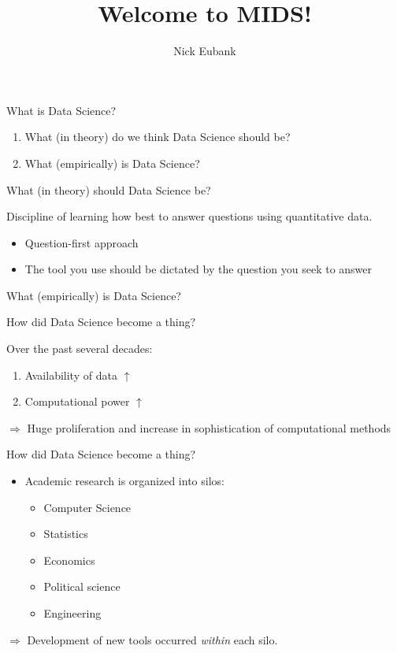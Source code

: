 \documentclass[11pt]{beamer}
\title{Welcome to MIDS!}
\author{\small Nick Eubank}
\date{\vspace*{.3in} \date}
\begin{document}
\begin{frame}
\maketitle
\end{frame}


\begin{frame}[c]{What is Data Science?}
\begin{enumerate}
	\pause \item What (\alert{in theory}) do we think Data Science should be?
	\pause \item What (\alert{empirically}) is Data Science?
\end{enumerate}
\end{frame}


\begin{frame}[c]{What (in theory) should Data Science be?}

\pause Discipline of learning how best to \alert{answer questions} using \alert{quantitative data.}

\pause
\begin{itemize}
	\item Question-first approach \\
	\pause \item The tool you use should be dictated by the question you seek to answer
\end{itemize}

\end{frame}

\begin{frame}[c]{What (empirically) is Data Science?}

\end{frame}

\begin{frame}[c]{How did Data Science become a thing?}

Over the past several decades:
\begin{enumerate}
	\item Availability of data $\uparrow$
	\item Computational power $\uparrow$
\end{enumerate}
\pause
$\Rightarrow$ Huge proliferation and increase in sophistication of computational methods
\end{frame}


\begin{frame}[c]{How did Data Science become a thing?}

\begin{itemize}
	\item Academic research is organized into silos:
	\pause
	\begin{itemize}
		\item Computer Science
		\item Statistics
		\item Economics
		\item Political science
		\item Engineering
	\end{itemize}
\end{itemize}
\pause $\Rightarrow$ Development of new tools occurred \emph{within} each silo.
\end{frame}
\end{document}
